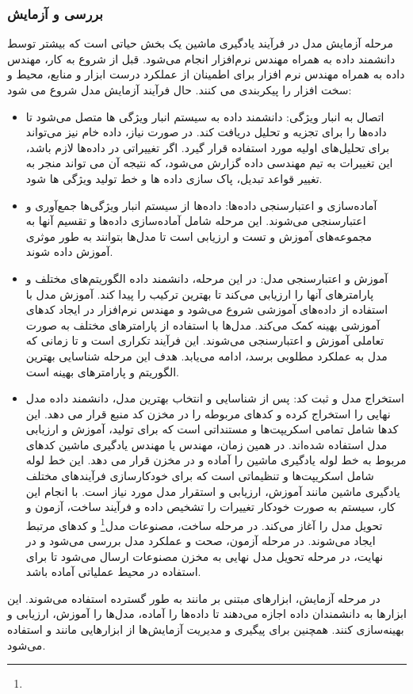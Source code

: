 \subsubsection{بررسی و آزمایش}
مرحله آزمایش مدل در فرآیند یادگیری ماشین یک بخش حیاتی است که بیشتر توسط دانشمند داده به همراه مهندس نرم‌افزار انجام می‌شود. قبل از شروع به کار، مهندس داده به همراه مهندس نرم افزار برای اطمینان از عملکرد درست ابزار و منابع، محیط و سخت افزار را پیکربندی می کنند. حال فرآیند آزمایش مدل شروع می شود:
\begin{itemize}
	\item 
اتصال به انبار ویژگی: 
دانشمند داده به سیستم انبار ویژگی‌ ها متصل می‌شود تا داده‌ها را برای تجزیه و تحلیل دریافت کند. در صورت نیاز، داده خام نیز می‌تواند برای تحلیل‌های اولیه مورد استفاده قرار گیرد. اگر تغییراتی در داده‌ها لازم باشد، این تغییرات به تیم مهندسی داده گزارش می‌شود، که نتیجه آن می تواند منجر به تغییر قواعد تبدیل، پاک سازی داده ها و خط تولید ویژگی ها شود.
	\item 
آماده‌سازی و اعتبارسنجی داده‌ها: 
داده‌ها از سیستم انبار ویژگی‌ها جمع‌آوری و اعتبارسنجی می‌شوند. این مرحله شامل آماده‌سازی داده‌ها و تقسیم آنها به مجموعه‌های آموزش و تست و ارزیابی است تا مدل‌ها بتوانند به طور موثری آموزش داده شوند.
	\item 
آموزش و اعتبارسنجی مدل: 
در این مرحله، دانشمند داده الگوریتم‌های مختلف و پارامترهای آنها را ارزیابی می‌کند تا بهترین ترکیب را پیدا کند. آموزش مدل با استفاده از داده‌های آموزشی شروع می‌شود و مهندس نرم‌افزار در ایجاد کدهای آموزشی بهینه کمک می‌کند. مدل‌ها با استفاده از پارامترهای مختلف به صورت تعاملی آموزش و اعتبارسنجی می‌شوند. این فرآیند تکراری است و تا زمانی که مدل به عملکرد مطلوبی برسد، ادامه می‌یابد. هدف این مرحله شناسایی بهترین الگوریتم و پارامترهای بهینه است. 
	\item 
	استخراج مدل و ثبت کد: 
	پس از شناسایی و انتخاب بهترین مدل، دانشمند داده مدل نهایی را استخراج کرده و کدهای مربوطه را در مخزن کد منبع قرار می دهد. این کدها شامل تمامی اسکریپت‌ها و مستنداتی است که برای تولید، آموزش و ارزیابی مدل استفاده شده‌اند. در همین زمان، مهندس  یا مهندس یادگیری ماشین کدهای مربوط به خط لوله یادگیری ماشین را آماده و در مخزن قرار می دهد. این خط لوله شامل اسکریپت‌ها و تنظیماتی است که برای خودکارسازی فرآیندهای مختلف یادگیری ماشین مانند آموزش، ارزیابی و استقرار مدل مورد نیاز است. با انجام این کار، سیستم  به صورت خودکار تغییرات را تشخیص داده و فرآیند ساخت، آزمون و تحویل مدل را آغاز می‌کند. در مرحله ساخت، مصنوعات مدل\footnote{} و کدهای مرتبط ایجاد می‌شوند. در مرحله آزمون، صحت و عملکرد مدل بررسی می‌شود و در نهایت، در مرحله تحویل مدل نهایی به مخزن مصنوعات ارسال می‌شود تا برای استفاده در محیط عملیاتی آماده باشد.	
\end{itemize}

در مرحله آزمایش، ابزارهای مبتنی بر  مانند  \cite{Jupyter} به طور گسترده استفاده می‌شوند. این ابزارها به دانشمندان داده اجازه می‌دهند تا داده‌ها را آماده، مدل‌ها را آموزش، ارزیابی و بهینه‌سازی کنند. همچنین برای پیگیری و مدیریت آزمایش‌ها از ابزارهایی مانند  و  استفاده می‌شود.







